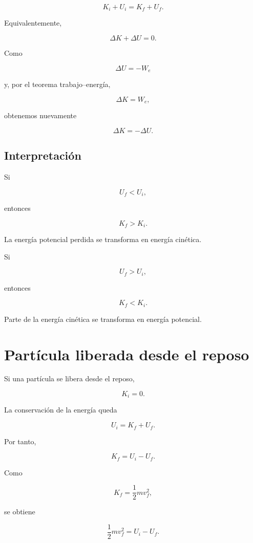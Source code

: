 \begin{equation}
\boxed{
K_i+U_i=K_f+U_f
}.
\label{eq:conservacion_energia_electrica}
\end{equation}

Equivalentemente,

\[
\boxed{
\Delta K+\Delta U=0
}.
\]

Como

\[
\Delta U=-W_e
\]

y, por el teorema trabajo--energía,

\[
\Delta K=W_e,
\]

obtenemos nuevamente

\[
\Delta K=-\Delta U.
\]


\subsection{Interpretación}

Si

\[
U_f<U_i,
\]

entonces

\[
K_f>K_i.
\]

La energía potencial perdida se transforma en energía cinética.

Si

\[
U_f>U_i,
\]

entonces

\[
K_f<K_i.
\]

Parte de la energía cinética se transforma en energía potencial.


\section{Partícula liberada desde el reposo}

Si una partícula se libera desde el reposo,

\[
K_i=0.
\]

La conservación de la energía queda

\[
U_i=K_f+U_f.
\]

Por tanto,

\[
K_f=U_i-U_f.
\]

Como

\[
K_f=\frac12mv_f^2,
\]

se obtiene

\begin{equation}
\boxed{
\frac12mv_f^2=U_i-U_f
}.
\label{eq:velocidad_desde_energia_electrica}
\end{equation}

